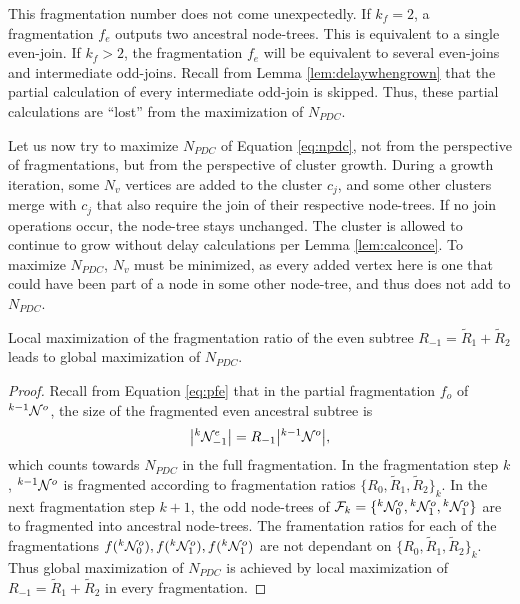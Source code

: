 This fragmentation number does not come unexpectedly. If $k_f=2$, a fragmentation $f_e$ outputs two ancestral node-trees. This is equivalent to a single even-join. If $k_f>2$, the fragmentation $f_e$ will be equivalent to several even-joins and intermediate odd-joins. Recall from Lemma \ref{lem:delaywhengrown} that the partial calculation of every intermediate odd-join is skipped. Thus, these partial calculations are ``lost'' from the maximization of $N_{PDC}$. 

Let us now try to maximize $N_{PDC}$ of Equation \eqref{eq:npdc}, not from the perspective of fragmentations, but from the perspective of cluster growth. During a growth iteration, some $N_v$ vertices are added to the cluster $c_j$, and some other clusters merge with $c_j$ that also require the join of their respective node-trees. If no join operations occur, the node-tree stays unchanged. The cluster is allowed to continue to grow without delay calculations per Lemma \ref{lem:calconce}. To maximize $N_{PDC}$, $N_v$ must be minimized, as every added vertex here is one that could have been part of a node in some other node-tree, and thus does not add to $N_{PDC}$. 

\begin{tcolorbox}[title=Revised addition]
  \begin{lemma}\label{lem:localmax}
    Local maximization of the fragmentation ratio of the even subtree $R_{-1}=\tilde{R}_1+\tilde{R}_2$ leads to global maximization of $N_{PDC}$.
  \end{lemma}
  \begin{proof}
    Recall from Equation \eqref{eq:pfe} that in the partial fragmentation $f_o$ of ${}^{k-1}\mathcal{N}^o$, the size of the fragmented even ancestral subtree is
    \begin{equation*}
      \abs{{}^{k}\mathcal{N}^e_{-1}} = R_{-1}\abs{{}^{k-1}\mathcal{N}^o}, 
    \end{equation*}
    which counts towards $N_{PDC}$ in the full fragmentation. In the fragmentation step $k$, ${}^{k-1}\mathcal{N}^o$ is fragmented according to fragmentation ratios $\{R_0, \tilde{R}_1, \tilde{R}_2\}_k$. In the next fragmentation step $k+1$, the odd node-trees of $\mathcal{F}_k=\{{}^{k}\mathcal{N}^o_0, {}^{k}\mathcal{N}^o_1, {}^{k}\mathcal{N}^o_1\}$ are to fragmented into ancestral node-trees. The framentation ratios for each of the fragmentations $f({}^{k}\mathcal{N}^o_0), f({}^{k}\mathcal{N}^o_1), f({}^{k}\mathcal{N}^o_1)$ are not dependant on $\{R_0, \tilde{R}_1, \tilde{R}_2\}_k$. Thus global maximization of $N_{PDC}$ is achieved by local maximization of $R_{-1}=\tilde{R}_1+\tilde{R}_2$ in every fragmentation. 
  \end{proof}
\end{tcolorbox}

